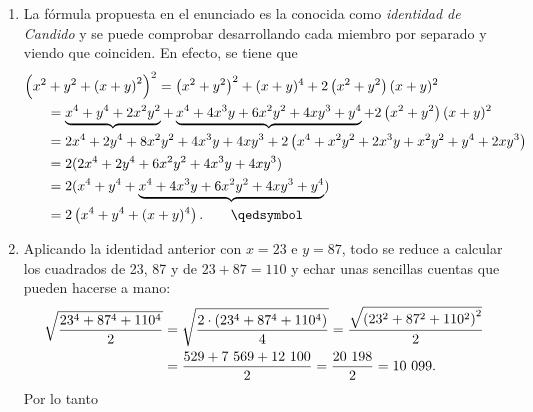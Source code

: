 \documentclass[
	fecha={5 de agosto de 2025},
	palabrasclave={RetoSecundaria, ago2025, álgebra, dif1},
	codigo=minted
]{RetoMatematico}
\begin{document}
\maketitle
\thispagestyle{empty}


\forma
\begin{enumerate}[label=\emph{\alph*})]
\item La fórmula propuesta en el enunciado es la conocida como \emph{identidad de Candido} y se puede comprobar desarrollando cada miembro por separado y viendo que coinciden. En efecto, se tiene que
\begin{align*}
	\Bigl(x^2&+y^2+\l(x+y\r)^2\Bigr)^2 = \l(x^2 + y^2\r)^2 + (x+y)^4 + 2\l(x^2 + y^2\r)(x+y)^2\\
	&= \underbrace{x^4 + y^4 + 2x^2y^2}+\underbrace{x^4 + 4x^3y + 6x^2y^2 + 4xy^3 + y^4} + 2\l(x^2 + y^2\r)(x+y)^2\\
	&= 2x^4 + 2y^4 + 8x^2y^2 + 4x^3y + 4xy^3 + 2\l(x^4 + x^2y^2 + 2x^3 y + x^2 y^2 + y^4 + 2xy^3\r)\\
	&= 2(2x^4 + 2y^4 + 6x^2y^2 + 4x^3 y + 4xy^3)\\
	&= 2(x^4 + y^4 + \underbrace{x^4 + 4x^3 y + 6x^2y^2 + 4xy^3 + y^4})\\
	&= 2\l(x^4 + y^4 + (x+y)^4\r). \tag*{\qedsymbol}
\end{align*}

\item Aplicando la identidad anterior con $x = 23$ e $y = 87$, todo se reduce a calcular los
cuadrados de 23, 87 y de $23 + 87 = 110$ y echar unas sencillas cuentas que pueden hacerse
a mano: \begin{align*}
	\sqrt{\frac{23^4+87^4+110^4}{2}} &= \sqrt{\frac{2\cdot\l(23^4+87^4+110^4\r)}{4}} = \frac{\sqrt{\l(23^2+87^2+110^2\r)^2}}{2}\\
	&= \frac{529 + 7\ 569 + 12\ 100}{2} = \frac{20\ 198}{2} = 10\ 099.
\end{align*} Por lo tanto 
\end{enumerate}
\end{document}
